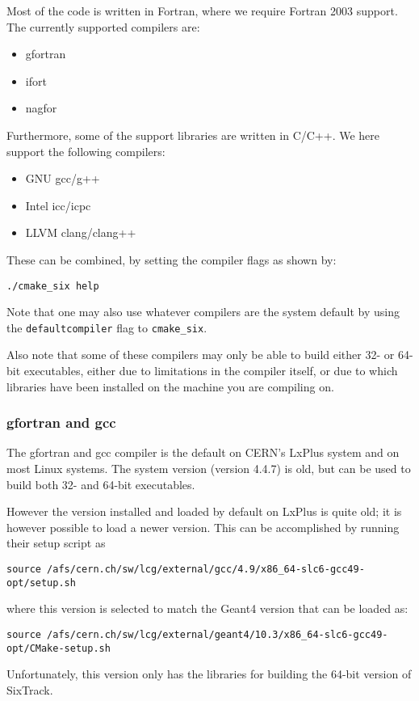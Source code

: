 \documentclass[english,BCOR=0mm,DIV=18]{scrartcl}
\begin{document}
Most of the code is written in Fortran, where we require Fortran 2003 support.
The currently supported compilers are:
\begin{itemize}
\item gfortran
\item ifort
\item nagfor
\end{itemize}
Furthermore, some of the support libraries are written in C/C++.
We here support the following compilers:
\begin{itemize}
\item GNU gcc/g++
\item Intel icc/icpc
\item LLVM clang/clang++
\end{itemize}
These can be combined, by setting the compiler flags as shown by:
\begin{lstlisting}
./cmake_six help
\end{lstlisting}
Note that one may also use whatever compilers are the system default by using the \texttt{defaultcompiler} flag to \texttt{cmake\_six}.

Also note that some of these compilers may only be able to build either 32- or 64-bit executables, either due to limitations in the compiler itself, or due to which libraries have been installed on the machine you are compiling on.

\subsubsection{gfortran and gcc}
\label{sec:building:compilers:gcc}
The gfortran and gcc compiler is the default on CERN's LxPlus system and on most Linux systems.
The system version (version 4.4.7) is old, but can be used to build both 32- and 64-bit executables.

However the version installed and loaded by default on LxPlus is quite old; it is however possible to load a newer version.
This can be accomplished by running their setup script as
\begin{lstlisting}
source /afs/cern.ch/sw/lcg/external/gcc/4.9/x86_64-slc6-gcc49-opt/setup.sh
\end{lstlisting}
where this version is selected to match the Geant4 version that can be loaded as:
\begin{lstlisting}
source /afs/cern.ch/sw/lcg/external/geant4/10.3/x86_64-slc6-gcc49-opt/CMake-setup.sh
\end{lstlisting}
Unfortunately, this version only has the libraries for building the 64-bit version of SixTrack.
\end{document}
